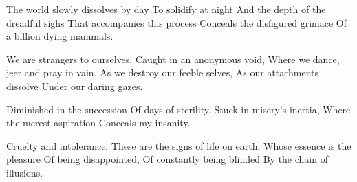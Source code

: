 \documentclass{article}
\newenvironment{stanza}{\begin{minipage}{10cm}\begin{internallinenumbers}\obeylines}{\end{internallinenumbers}\end{minipage}\vspace{\baselineskip}}
\begin{document}
\begin{stanza}
The world slowly dissolves by day
To solidify at night
And the depth of the dreadful sighs
That accompanies this process
Conceals the disfigured grimace
Of a billion dying mammals.
\end{stanza}

\begin{stanza}
We are strangers to ourselves,
Caught in an anonymous void,
Where we dance, jeer and pray in vain,
As we destroy our feeble selves,
As our attachments dissolve
Under our daring gazes.
\end{stanza}

\begin{stanza}
Diminished in the succession
Of days of sterility,
Stuck in misery's inertia,
Where the merest aspiration
Conceals my insanity.
\end{stanza}

\begin{stanza}
Cruelty and intolerance,
These are the signs of life on earth,
Whose essence is the pleasure
Of being disappointed,
Of constantly being blinded
By the chain of illusions.
\end{stanza}
\end{document}
